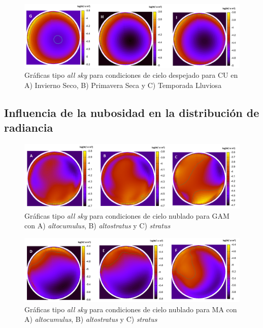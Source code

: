 \begin{figure}[H]
  \centering
    \includegraphics[width=1\textwidth]{4}
  \caption{Gráficas tipo \textit{all sky} para condiciones de cielo despejado para CU en A) Invierno Seco, B) Primavera Seca y C) Temporada Lluviosa} 
  \label{4}
\end{figure}

\newpage

\subsection{Influencia de la nubosidad en la distribución de radiancia}

\begin{figure}[H]
  \centering
    \includegraphics[width=1\textwidth]{5}
  \caption{Gráficas tipo \textit{all sky} para condiciones de cielo nublado para GAM con A) \textit{altocumulus}, B) \textit{altostratus} y C) \textit{stratus}} 
  \label{5}
\end{figure}

\begin{figure}[H]
  \centering
    \includegraphics[width=1\textwidth]{6}
  \caption{Gráficas tipo \textit{all sky} para condiciones de cielo nublado para MA con A) \textit{altocumulus}, B)  \textit{altostratus} y C) \textit{stratus}} 
  \label{6}
\end{figure}

